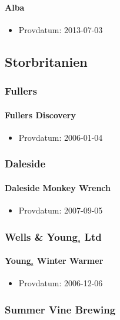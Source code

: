 \documentclass[11pt]{article}
\begin{document}
\paragraph{Alba}
\label{sec:org67a13e1}
\begin{itemize}
\item Provdatum: 2013-07-03
\end{itemize}
\subsection{Storbritanien}
\label{sec:org4271ef7}
\subsubsection{Fullers}
\label{sec:orgbc67a8a}
\paragraph{Fullers Discovery}
\label{sec:org50de0e6}
\begin{itemize}
\item Provdatum: 2006-01-04
\end{itemize}
\subsubsection{Daleside}
\label{sec:org107f5ce}
\paragraph{Daleside Monkey Wrench}
\label{sec:org714008d}
\begin{itemize}
\item Provdatum: 2007-09-05
\end{itemize}
\subsubsection{Wells \& Young\(_{\text{s}}\) Ltd}
\label{sec:org5923070}
\paragraph{Young\(_{\text{s}}\) Winter Warmer}
\label{sec:org541abbd}
\begin{itemize}
\item Provdatum: 2006-12-06
\end{itemize}
\subsubsection{Summer Vine Brewing}
\label{sec:org616d1c1}
\end{document}
